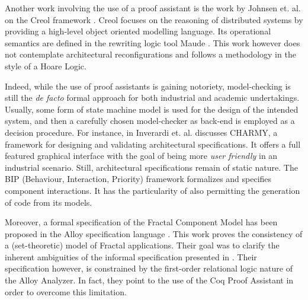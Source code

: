 	
	
	Another work involving the use of a proof assistant is the work by Johnsen et. al. 
	on the \textsf{Creol} framework \cite{johnsen06tcs}. \textsf{Creol} focuses on
	the reasoning of distributed systems by providing a high-level object oriented
	modelling language. Its operational semantics are defined in the rewriting logic tool 
	Maude \cite{Maude2:03}. This work however does not contemplate architectural 
	reconfigurations and follows a methodology in the style of a Hoare Logic. 	
		
    

   	
	Indeed, while the use of proof assistants is gaining notoriety, model-checking is still
	the \textit{de facto} formal approach for both industrial and academic undertakings.
	Usually, some form of state machine model is used for the design of the intended
	system,  and then a carefully chosen model-checker as back-end is employed as
	a decision procedure. %
	For instance, in \cite{p.2005-1} Inverardi et. al. 
	discusses \textsf{CHARMY}, a framework for designing and validating architectural 
	specifications. It offers a full featured graphical interface with the goal of being more 
	\textit{user friendly} in an industrial scenario. Still,
	architectural specifications remain of static nature. 
	The BIP (Behaviour, Interaction, Priority) 
	framework \cite{BBB+11a} formalizes and specifies component interactions.
	It has the particularity of also permitting the generation of code from its models.
	

   	Moreover, a formal specification of the Fractal Component Model has 
   	been proposed in the  Alloy specification language \cite{MERLE:2008:INRIA-00338987:1}. 
	This work proves the consistency of a (set-theoretic) model of Fractal applications. 	 
	Their goal was to clarify the inherent ambiguities of the informal specification presented
  	in \cite{fractalSpec}. Their specification however, is constrained by the first-order relational logic nature 
   	of the Alloy Analyzer. In fact, they point to the use of the Coq Proof Assistant in order 
   	to overcome this limitation.	
	
